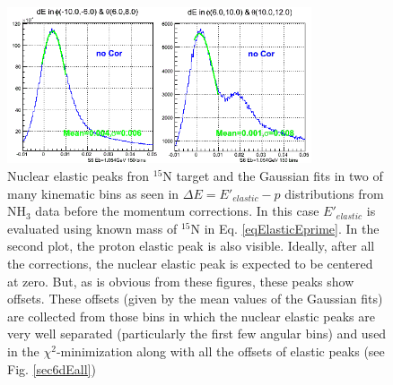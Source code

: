 \begin{figure}[H]%
\centering
  \leavevmode \includegraphics[width=0.8\textwidth]{figuresEG4/FigKineCor/elasticPeaksFromNH3wdWoCorEi0mN15gausCropped.png} 
  \caption[Nuclear elastic peak fron $^{15}$N target]{Nuclear elastic peaks fron $^{15}$N target and the Gaussian fits in two
of many kinematic bins as seen in $\Delta E = E'_{elastic} - p$ distributions from NH$_3$ data before the momentum corrections.
In this case $E'_{elastic}$ is evaluated using known mass of $^{15}$N in Eq. \ref{eqElasticEprime}.
In the second plot, the proton elastic peak is also visible. Ideally, after all the corrections, the nuclear elastic peak is 
expected to be centered at zero. But, as is obvious from these figures, these peaks show offsets. These offsets (given
by the mean values of the Gaussian fits) are collected from those bins in which the nuclear elastic peaks are very well
separated (particularly the first few angular bins) and used in the $\chi^2$-minimization along with all the offsets of
elastic peaks (see Fig. \ref{sec6dEall})}
\label{sec6dEnucElastEbi0}
\end{figure}



